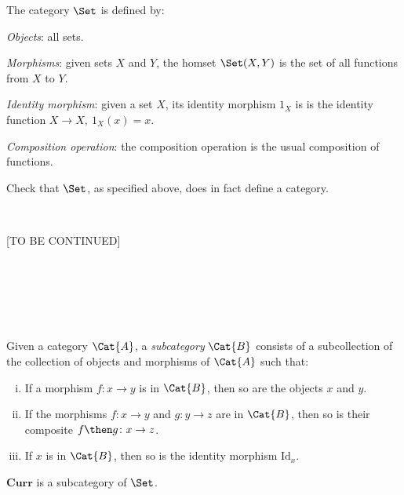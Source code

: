 \begin{shaded}
\begin{definition}
    The category $\Set$ is defined by:
    \begin{compactenum}
    \item \emph{Objects}: all sets.
    \item \emph{Morphisms}: given sets $X$ and  $Y$, the homset $\Set(X,Y)$ is the set of all functions from $X$ to $Y$.
    \item \emph{Identity morphism}: given a set $X$, its identity morphism $\text{1}_X$ is 
    is the identity function $X \rightarrow X, \ \text{1}_X(x) = x$.
    \item \emph{Composition operation}: the composition operation is the usual composition of functions.
    \end{compactenum}
\end{definition}
\end{shaded}

\begin{exercise}
Check that $\Set$, as specified above, does in fact define a category. 
\end{exercise}

\


[TO BE CONTINUED]

\

\

\
\begin{shaded}
\begin{definition}[Subcategory]
\label{def:subcategory}
	Given a category $\Cat{A}$, a \emph{subcategory} $\Cat{B}$ consists of a subcollection of the collection of objects and morphisms of $\Cat{A}$ such that:
	\begin{enumerate}[(i)]
	\item If a morphism $f \colon x\to y$ is in $\Cat{B}$, then so are the objects $x$ and $y$.
	\item If the morphisms $f\colon x\to y$ and $g\colon y\to z$ are in $\Cat{B}$, then so is their composite $f\then g\colon x\to z$.
	\item If $x$ is in $\Cat{B}$, then so is the identity morphism $\text{Id}_x$.
	\end{enumerate}
\end{definition}
\end{shaded}

\begin{lemma}
    $\mathbf{Curr}$ is a subcategory of $\Set$.
\end{lemma}

